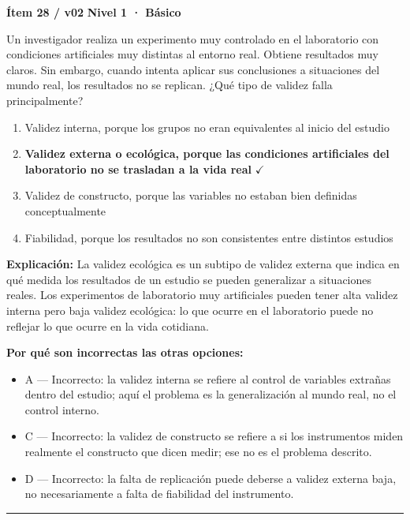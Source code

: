 \documentclass[12pt,a4paper]{article}
\begin{document}
\begin{mdframed}[backgroundcolor=fondogris,linecolor=azul,linewidth=1pt,innerleftmargin=10pt,innerrightmargin=10pt,innertopmargin=7pt,innerbottommargin=7pt]
\textbf{Ítem 28 / v02} \hfill {\small\bfseries\color{azul} Nivel 1 · Básico}
\end{mdframed}

Un investigador realiza un experimento muy controlado en el laboratorio con condiciones artificiales muy distintas al entorno real. Obtiene resultados muy claros. Sin embargo, cuando intenta aplicar sus conclusiones a situaciones del mundo real, los resultados no se replican. ¿Qué tipo de validez falla principalmente?

\begin{enumerate}
  \item[A.] Validez interna, porque los grupos no eran equivalentes al inicio del estudio
  \item[\textbf{\color{verde}B.}] \textbf{\color{verde} Validez externa o ecológica, porque las condiciones artificiales del laboratorio no se trasladan a la vida real} \hfill $\checkmark$
  \item[C.] Validez de constructo, porque las variables no estaban bien definidas conceptualmente
  \item[D.] Fiabilidad, porque los resultados no son consistentes entre distintos estudios
\end{enumerate}

\noindent\textbf{\color{azul}Explicación:} La validez ecológica es un subtipo de validez externa que indica en qué medida los resultados de un estudio se pueden generalizar a situaciones reales. Los experimentos de laboratorio muy artificiales pueden tener alta validez interna pero baja validez ecológica: lo que ocurre en el laboratorio puede no reflejar lo que ocurre en la vida cotidiana.

\noindent\textbf{\color{gris}Por qué son incorrectas las otras opciones:}
\begin{itemize}
  \item {\small A — Incorrecto: la validez interna se refiere al control de variables extrañas dentro del estudio; aquí el problema es la generalización al mundo real, no el control interno.}
  \item {\small C — Incorrecto: la validez de constructo se refiere a si los instrumentos miden realmente el constructo que dicen medir; ese no es el problema descrito.}
  \item {\small D — Incorrecto: la falta de replicación puede deberse a validez externa baja, no necesariamente a falta de fiabilidad del instrumento.}
\end{itemize}
\vspace{8pt}\hrule\vspace{10pt}
\end{document}
